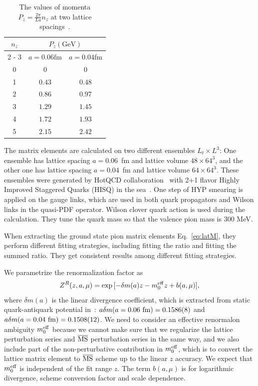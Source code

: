 \documentclass[prd,aps,twocolumn,preprintnumbers, showpacs, nofootinbib,superscriptaddress,notitlepage]{revtex4-2}
\def\bea{\begin{eqnarray}}
\def\eea{\end{eqnarray}}
\begin{document}
\begin{table}[htbp]
\centering
    \begin{tabular}{|c|c|c|}
    \hline \hline $n_{z}$ & 
    \multicolumn{2}{|c|}{$P_{z}(\mathrm{GeV})$} \\
    \cline { 2 - 3 } & $a=0.06 \mathrm{fm}$ & $a=0.04 \mathrm{fm}$ \\
    \hline 0 & 0 & 0 \\
    1 & $0.43$ & $0.48$ \\
    2 & $0.86$ & $0.97$ \\
    3 & $1.29$ & $1.45$ \\
    4 & $1.72$ & $1.93$ \\
    5 & $2.15$ & $2.42$ \\
    \hline \hline
    \end{tabular}
    \caption{The values of momenta $P_{z}=\frac{2 \pi}{L a} n_{z}$ at two lattice spacings~\cite{Gao:2020ito}.}
    \label{tab:latticedata}
\end{table}

The matrix elements are calculated on two different ensembles $L_t \times L^3$: One ensemble has lattice spacing $a=0.06$~fm and lattice volume $48 \times 64^3$, and the other one has lattice spacing $a=0.04$~fm and lattice volume $64 \times 64^3$. These ensembles were generated by HotQCD collaboration~\cite{HotQCD:2014kol} with 2+1 flavor Highly Improved Staggered Quarks (HISQ) in the sea~\cite{Follana:2006rc}. One step of HYP smearing is applied on the gauge links, which are used in both quark propagators and Wilson links in the quasi-PDF operator. Wilson clover quark action is used during the calculation. They tune the quark mass so that the valence pion mass is 300 MeV. 

When extracting the ground state pion matrix elements Eq.~\eqref{eq:latM}, they perform different fitting strategies, including fitting the ratio and fitting the summed ratio. They get consistent results among different fitting strategies. 

We parametrize the renormalization factor as
\bea\label{ZRmodel}
Z^{R}(z,a,\mu) = \exp{[-\delta m(a) z - m_{0}^{\rm eff}z + b(a,\mu)]},
\eea
where $\delta m(a)$ is the linear divergence coefficient, which is extracted from static quark-antiquark potential in~\cite{Gao:2021dbh}: $a \delta m(a=0.06~{\rm fm})=0.1586(8)$ and $a \delta m(a=0.04~{\rm fm})=0.1508(12)$. We need to consider an effective renormalon ambiguity $m_0^{\rm eff}$ because we cannot make sure that we regularize the lattice perturbation series and $\overline{\rm MS}$ perturbation series in the same way, and we also include part of the non-perturbative contribution in $m_0^{\rm eff}$, which is to convert the lattice matrix element to $\overline{\rm MS}$ scheme up to the linear $z$ accuracy. We expect that $m_0^{\rm eff}$ is independent of the fit range $z$. The term $b(a,\mu)$ is for logarithmic divergence, scheme conversion factor and scale dependence. 
\end{document}

